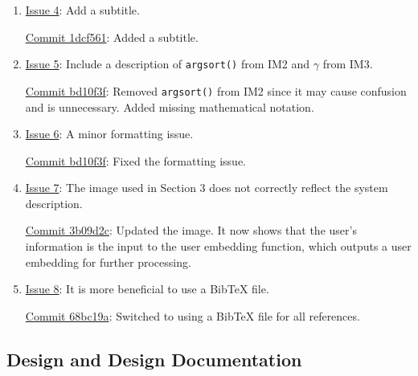 \documentclass{article}
\begin{document}
\begin{enumerate}
    \item \href{https://github.com/V-AS/Two-tower-recommender-system/issues/4}{Issue 4}: Add a subtitle.  
    
    \href{https://github.com/V-AS/Two-tower-recommender-system/commit/1dcf561326107cf6e24e31ce233470af9759e686}{Commit 1dcf561}: Added a subtitle.  

    \item \href{https://github.com/V-AS/Two-tower-recommender-system/issues/5}{Issue 5}: Include a description of \texttt{argsort()} from IM2 and \(\gamma\) from IM3.  
    
    \href{https://github.com/V-AS/Two-tower-recommender-system/commit/bd10f3f0f50a86dc01775c60a1cfb17021bd3eea}{Commit bd10f3f}: Removed \texttt{argsort()} from IM2 since it may cause confusion and is unnecessary. Added missing mathematical notation.  

    \item \href{https://github.com/V-AS/Two-tower-recommender-system/issues/6}{Issue 6}: A minor formatting issue.  
    
    \href{https://github.com/V-AS/Two-tower-recommender-system/commit/bd10f3f0f50a86dc01775c60a1cfb17021bd3eea}{Commit bd10f3f}: Fixed the formatting issue.  

    \item \href{https://github.com/V-AS/Two-tower-recommender-system/issues/7}{Issue 7}: The image used in Section 3 does not correctly reflect the system description.  
    
    \href{https://github.com/V-AS/Two-tower-recommender-system/commit/3b09d2cee38c41d633e0225adf660de7cd1bfef5}{Commit 3b09d2c}: Updated the image. It now shows that the user's information is the input to the user embedding function, which outputs a user embedding for further processing.  

    \item \href{https://github.com/V-AS/Two-tower-recommender-system/issues/8}{Issue 8}: It is more beneficial to use a BibTeX file.  
    
    \href{https://github.com/V-AS/Two-tower-recommender-system/commit/68bc19ab40ea8c8ef814e4483daf31362086bb41}{Commit 68bc19a}: Switched to using a BibTeX file for all references.  
\end{enumerate}

\subsection{Design and Design Documentation}
\end{document}
